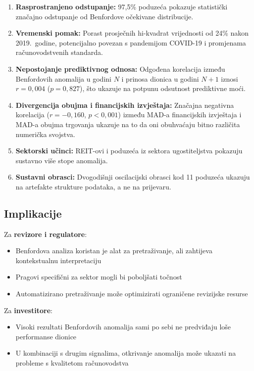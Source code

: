 \documentclass[12pt,a4paper]{article}
\begin{document}
\begin{enumerate}
    \item \textbf{Rasprostranjeno odstupanje:} 97,5\% poduzeća pokazuje statistički značajno odstupanje od Benfordove očekivane distribucije.

    \item \textbf{Vremenski pomak:} Porast prosječnih hi-kvadrat vrijednosti od 24\% nakon 2019.\ godine, potencijalno povezan s pandemijom COVID-19 i promjenama računovodstvenih standarda.

    \item \textbf{Nepostojanje prediktivnog odnosa:} Odgođena korelacija između Benfordovih anomalija u godini $N$ i prinosa dionica u godini $N{+}1$ iznosi $r = 0{,}004$ ($p = 0{,}827$), što ukazuje na potpunu odsutnost prediktivne moći.

    \item \textbf{Divergencija obujma i financijskih izvještaja:} Značajna negativna korelacija ($r = -0{,}160$, $p < 0{,}001$) između MAD-a financijskih izvještaja i MAD-a obujma trgovanja ukazuje na to da oni obuhvaćaju bitno različita numerička svojstva.

    \item \textbf{Sektorski učinci:} REIT-ovi i poduzeća iz sektora ugostiteljstva pokazuju sustavno više stope anomalija.

    \item \textbf{Sustavni obrasci:} Dvogodišnji oscilacijski obrasci kod 11 poduzeća ukazuju na artefakte strukture podataka, a ne na prijevaru.
\end{enumerate}

\subsection{Implikacije}

Za \textbf{revizore i regulatore}:
\begin{itemize}
    \item Benfordova analiza koristan je alat za pretraživanje, ali zahtijeva kontekstualnu interpretaciju
    \item Pragovi specifični za sektor mogli bi poboljšati točnost
    \item Automatizirano pretraživanje može optimizirati ograničene revizijske resurse
\end{itemize}

Za \textbf{investitore}:
\begin{itemize}
    \item Visoki rezultati Benfordovih anomalija sami po sebi ne predviđaju loše performanse dionice
    \item U kombinaciji s drugim signalima, otkrivanje anomalija može ukazati na probleme s kvalitetom računovodstva
\end{itemize}
\end{document}

